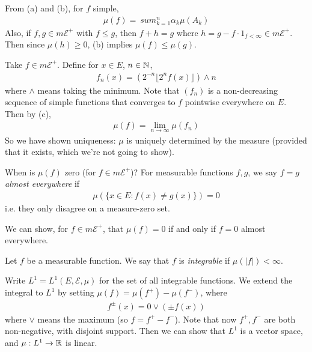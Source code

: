 \documentclass[a4paper]{article}
\begin{document}
From (a) and (b), for $f$ simple,
\begin{equation*}
\begin{aligned}
\mu(f) =\ sum_{k=1}^n \alpha_k \mu(A_k)
\end{aligned}
\end{equation*}
Also, if $f,g \in m\mathcal{E}^+$ with $f \leq g$, then $f+h = g$ where $h = g - f \cdot 1_{f < \infty} \in m\mathcal{E}^+$. Then since $\mu(h) \geq 0$, (b) implies $\mu(f) \leq \mu(g)$.

Take $f \in m\mathcal{E}^+$. Define for $x \in E$, $n \in \mathbb{N}$,
\begin{equation*}
\begin{aligned}
f_n(x) = \left(2^{-n} \lfloor 2^n f(x)\rfloor \right) \wedge n
\end{aligned}
\end{equation*}
where $\wedge$ means taking the minimum. Note that $(f_n)$ is a non-decreasing sequence of simple functions that converges to $f$ pointwise everywhere on $E$. Then by (c),
\begin{equation*}
\begin{aligned}
\mu(f) = \lim_{n \to \infty} \mu(f_n)
\end{aligned}
\end{equation*}
So we have shown uniqueness: $\mu$ is uniquely determined by the measure (provided that it exists, which we're not going to show).

When is $\mu(f)$ zero (for $f \in m\mathcal{E}^+$)? For measurable functions $f,g$, we say $f=g$ \emph{almost everywhere} if 
\begin{equation*}
\begin{aligned}
\mu(\{x \in E: f(x) \neq g(x) \}) = 0
\end{aligned}
\end{equation*}
i.e. they only disagree on a measure-zero set.

We can show, for $f \in m\mathcal{E}^+$, that $\mu(f)=0$ if and only if $f=0$ almost everywhere.

Let $f$ be a measurable function. We say that $f$ is \emph{integrable} if $\mu(|f|) < \infty$.

Write $L^1 = L^1(E,\mathcal{E},\mu)$ for the set of all integrable functions. We extend the integral to $L^1$ by setting $\mu(f) = \mu(f^+) - \mu(f^-)$, where 
\begin{equation*}
\begin{aligned}
f^\pm (x) = 0 \vee (\pm f(x))
\end{aligned}
\end{equation*}
where $\vee$ means the maximum (so $f = f^+ - f^-$). Note that now $f^+,f^-$ are both non-negative, with disjoint support. Then we can show that $L^1$ is a vector space, and $\mu:L^1 \to \mathbb{R}$ is linear.
\end{document}

